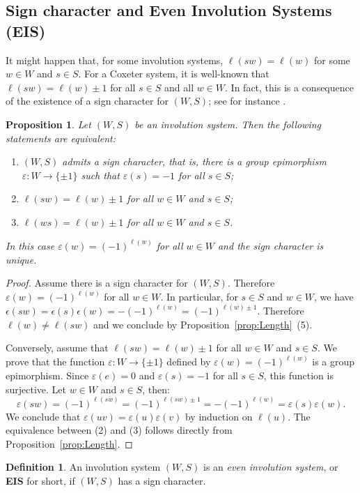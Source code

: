 \documentclass[A4paper, oneside]{amsart}
\newcommand{\id}{\textit{e}}
\newcommand{\EIS}{\textnormal{\bf EIS}\xspace}
\newtheorem{prop}[thm]{Proposition}
\theoremstyle{definition}
\newtheorem{defi}[thm]{Definition}
\begin{document}
\subsection{Sign character and Even Involution Systems (\EIS)}\label{ss:EIS}

It might happen that, for some involution systems,  $\ell(sw)=\ell(w)$ for some $w\in W$ and $s\in S$. For a Coxeter system, it is well-known that $\ell(sw)=\ell(w)\pm1$ for all $s\in S$ and all $w\in W$. In fact, this is a consequence of the existence of a sign character for $(W,S)$; see for instance \cite{DyLectures}.

\begin{prop}\label{prop:Sign} Let $(W,S)$ be an involution system. Then the following statements are equivalent:
\begin{enumerate}
\item $(W,S)$ admits a {\em sign character}, that is, there is a group epimorphism $\varepsilon:W\to \{\pm 1\}$ such that $\varepsilon (s)=-1$ for all $s\in S$;
\item  $\ell(sw)=\ell(w)\pm 1$ for all $w\in W$ and $s\in S$;
\item $\ell(ws)=\ell(w)\pm 1$ for all $w\in W$ and $s\in S$.
\end{enumerate}
In this case $\varepsilon(w)=(-1)^{\ell(w)}$ for all $w\in W$ and the sign character is unique.
\end{prop}
\begin{proof} Assume there is a sign character for $(W,S)$. Therefore $\varepsilon(w)=(-1)^{\ell(w)}$ for all $w\in W$. In particular, for $s\in S$ and $w\in W$, we have $\epsilon(sw)=\epsilon(s)\epsilon(w)=-(-1)^{\ell(w)}=(-1)^{\ell(w)\pm1}$. Therefore $\ell(w)\not = \ell(sw)$ and we conclude by Proposition~\ref{prop:Length}~(5). 

Conversely, assume that $\ell(sw)=\ell(w)\pm 1$ for all $w\in W$ and $s\in S$. We prove that the function $\varepsilon:W\to \{\pm 1\}$ defined by $\varepsilon(w)=(-1)^{\ell(w)}$ is a group epimorphism. Since $\varepsilon(\id)=0$ and $\varepsilon (s)=-1$ for all $s\in S$, this function is surjective. Let $w\in W$ and $s\in S$, then:
$$
\varepsilon (sw)=(-1)^{\ell(sw)}=(-1)^{\ell(sw)\pm1}=-(-1)^{\ell(w)}=\varepsilon(s)\varepsilon(w).
$$
We conclude that $\varepsilon(uv)=\varepsilon(u)\varepsilon(v)$ by induction on $\ell(u)$. The equivalence between (2) and (3) follows directly from Proposition~\ref{prop:Length}.
\end{proof}


\begin{defi}\label{def:EIS} An involution system $(W,S)$  is an {\em even involution system}, or \EIS for short, if $(W,S)$ has a sign character.
\end{defi}
\end{document}
